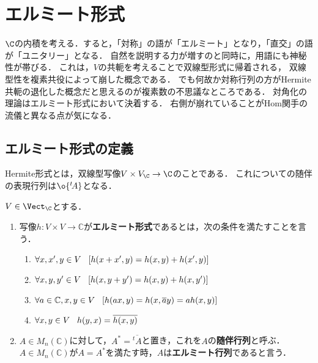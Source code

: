\documentclass[uplatex, dvipdfmx]{jsreport}
\begin{document}
\section{エルミート形式}

\begin{tcolorbox}[colframe=ForestGreen, colback=ForestGreen!10!white, breakable]
    $\C$の内積を考える．すると，「対称」の語が「エルミート」となり，「直交」の語が「ユニタリー」となる．
    自然を説明する力が増すのと同時に，用語にも神秘性が帯びる．
    これは，$V$の共軛を考えることで双線型形式に帰着される，
    双線型性を複素共役によって崩した概念である．
    でも何故か対称行列の方がHermite共軛の退化した概念だと思えるのが複素数の不思議なところである．
    対角化の理論はエルミート形式において決着する．
    右側が崩れていることがHom関手の流儀と異なる点が気になる．
\end{tcolorbox}

\subsection{エルミート形式の定義}

\begin{tcolorbox}[colframe=ForestGreen, colback=ForestGreen!10!white, breakable]
    Hermite形式とは，双線型写像$V\times V_\C\to\C$のことである．
    これについての随伴の表現行列は$\o{{}^t\!A}$となる．
\end{tcolorbox}

\begin{definition}
    $V\in\Vect_\C$とする．
    \begin{enumerate}
        \item 写像$h:V\times V\longrightarrow\mathbb{C}$が\textbf{エルミート形式}であるとは，次の条件を満たすことを言う．
        \begin{enumerate}[(1)]
            \item $\forall x,x',y\in V \hspace{3mm} [h(x+x',y)=h(x,y)+h(x',y)]$
            \item $\forall x,y,y'\in V \hspace{3mm} [h(x,y+y')=h(x,y)+h(x,y')]$
            \item $\forall a\in\mathbb{C}, x,y\in V \hspace{3mm} [h(ax,y)=h(x,\overline{a}y)=ah(x,y)]$
            \item $\forall x,y\in V \hspace{3mm} h(y,x)=\overline{h(x,y)}$
        \end{enumerate}
        \item $A\in M_n(\mathbb{C})$に対して，$A^*=\overline{{}^t\!A}$と置き，これを$A$の\textbf{随伴行列}と呼ぶ．$A\in M_n(\mathbb{C})$が$A=A^*$を満たす時，$A$は\textbf{エルミート行列}であると言う．
    \end{enumerate}
\end{definition}
\end{document}
